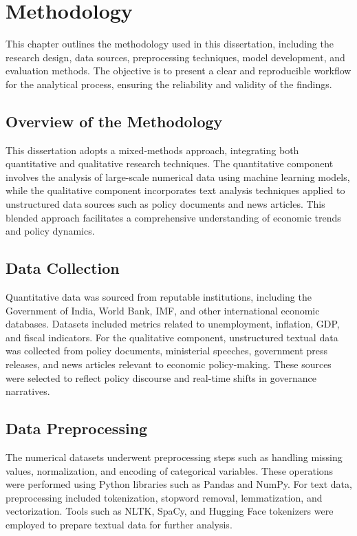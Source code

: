 \chapter{Methodology}
\label{chap:methodology}

This chapter outlines the methodology used in this dissertation, including the research design, data sources, preprocessing techniques, model development, and evaluation methods. The objective is to present a clear and reproducible workflow for the analytical process, ensuring the reliability and validity of the findings.

\section{Overview of the Methodology}
\label{sec:overview-methodology}
This dissertation adopts a mixed-methods approach, integrating both quantitative and qualitative research techniques. The quantitative component involves the analysis of large-scale numerical data using machine learning models, while the qualitative component incorporates text analysis techniques applied to unstructured data sources such as policy documents and news articles. This blended approach facilitates a comprehensive understanding of economic trends and policy dynamics.

\section{Data Collection}
\label{sec:data-collection}
Quantitative data was sourced from reputable institutions, including the Government of India, World Bank, IMF, and other international economic databases. Datasets included metrics related to unemployment, inflation, GDP, and fiscal indicators.
For the qualitative component, unstructured textual data was collected from policy documents, ministerial speeches, government press releases, and news articles relevant to economic policy-making. These sources were selected to reflect policy discourse and real-time shifts in governance narratives.

\section{Data Preprocessing}
\label{sec:data-preprocessing}
The numerical datasets underwent preprocessing steps such as handling missing values, normalization, and encoding of categorical variables. These operations were performed using Python libraries such as Pandas and NumPy.
For text data, preprocessing included tokenization, stopword removal, lemmatization, and vectorization. Tools such as NLTK, SpaCy, and Hugging Face tokenizers were employed to prepare textual data for further analysis.

